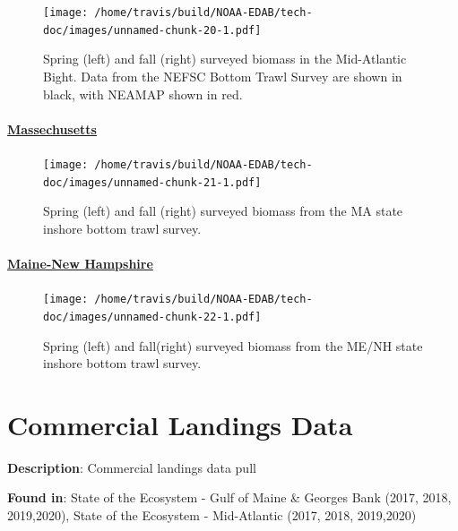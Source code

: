 \documentclass[
]{book}
\begin{document}
\begin{figure}
\centering
\texttt{[image: /home/travis/build/NOAA-EDAB/tech-doc/images/unnamed-chunk-20-1.pdf]}
\caption{\label{fig:unnamed-chunk-20}Spring (left) and fall (right) surveyed biomass in the Mid-Atlantic Bight. Data from the NEFSC Bottom Trawl Survey are shown in black, with NEAMAP shown in red.}
\end{figure}

\hypertarget{massechusetts}{%
\subsubsection{\texorpdfstring{\href{https://github.com/NOAA-EDAB/ecodata/blob/master/chunk-scripts/macrofauna.Rmd-MA-inshore.R}{Massechusetts}}{Massechusetts}}\label{massechusetts}}

\begin{figure}
\centering
\texttt{[image: /home/travis/build/NOAA-EDAB/tech-doc/images/unnamed-chunk-21-1.pdf]}
\caption{\label{fig:unnamed-chunk-21}Spring (left) and fall (right) surveyed biomass from the MA state inshore bottom trawl survey.}
\end{figure}

\hypertarget{maine-new-hampshire}{%
\subsubsection{\texorpdfstring{\href{https://github.com/NOAA-EDAB/ecodata/blob/master/chunk-scripts/macrofauna.Rmd-menh-survey.R}{Maine-New Hampshire}}{Maine-New Hampshire}}\label{maine-new-hampshire}}

\begin{figure}
\centering
\texttt{[image: /home/travis/build/NOAA-EDAB/tech-doc/images/unnamed-chunk-22-1.pdf]}
\caption{\label{fig:unnamed-chunk-22}Spring (left) and fall(right) surveyed biomass from the ME/NH state inshore bottom trawl survey.}
\end{figure}

\hypertarget{comdat}{%
\chapter{Commercial Landings Data}\label{comdat}}

\textbf{Description}: Commercial landings data pull

\textbf{Found in}: State of the Ecosystem - Gulf of Maine \& Georges Bank (2017, 2018, 2019,2020), State of the Ecosystem - Mid-Atlantic (2017, 2018, 2019,2020)
\end{document}
